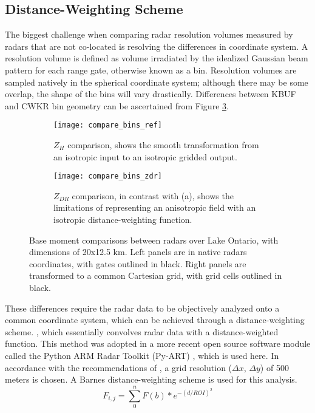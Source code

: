 \subsection{Distance-Weighting Scheme}
The biggest challenge when comparing radar resolution volumes measured by radars that are not co-located is resolving the differences in coordinate system. A resolution volume is defined as volume irradiated by the idealized Gaussian beam pattern for each range gate, otherwise known as a bin. Resolution volumes are sampled natively in the spherical coordinate system; although there may be some overlap, the shape of the bins will vary drastically. Differences between KBUF and CWKR bin geometry can be ascertained from Figure \ref{fig:compare_bins}. 
\begin{figure}[h]
\centering
   \begin{subfigure}{1.0\textwidth} \centering
     \texttt{[image: compare\_bins\_ref]}
     \caption{$Z_H$ comparison, shows the smooth transformation from an isotropic input to an isotropic gridded output.}\label{fig:compare_ref}
   \end{subfigure}
   \begin{subfigure}{1.0\textwidth} \centering
     \texttt{[image: compare\_bins\_zdr]}
     \caption{$Z_{DR}$ comparison, in contrast with (a), shows the limitations of representing an anisotropic field with an isotropic distance-weighting function. }\label{fig:compare_zdr}
   \end{subfigure}
\caption{Base moment comparisons between radars over Lake Ontario, with dimensions of 20x12.5 km. Left panels are in native radars coordinates, with gates outlined in black. Right panels are transformed to a common Cartesian grid, with grid cells outlined in black.} \label{fig:compare_bins}
\end{figure}
These differences require the radar data to be objectively analyzed onto a common coordinate system, which can be achieved through a distance-weighting scheme.  , which essentially convolves radar data with a distance-weighted function. This method was adopted in a more recent open source software module called the Python ARM Radar Toolkit (Py-ART) \citep{Py-ART}, which is used here. In accordance with the recommendations of \cite{Pauly1990}, a grid resolution ($\Delta x$, $\Delta y$) of 500 meters is chosen. A Barnes distance-weighting scheme is used for this analysis. 
\begin{equation}\label{eq:barnesdws}
F_{i,j} = \sum_0^n F(b) * e^{-(d/ROI)^{2}}
\end{equation}
